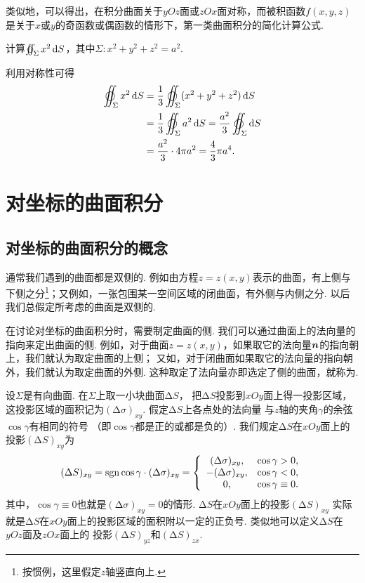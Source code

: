 类似地，可以得出，在积分曲面关于\(yOz\)面或\(zOx\)面对称，而被积函数\(f(x,y,z)\)是关于\(x\)或\(y\)的奇函数或偶函数的情形下，第一类曲面积分的简化计算公式.

\begin{example}
计算\(\varoiint_{\Sigma} x^2 \dd{S}\)，其中\(\Sigma: x^2+y^2+z^2=a^2\).
\begin{solution}
利用对称性可得\begin{align*}
\varoiint_{\Sigma} x^2 \dd{S}
&= \frac{1}{3} \varoiint_{\Sigma} (x^2+y^2+z^2) \dd{S} \\
&= \frac{1}{3} \varoiint_{\Sigma} a^2 \dd{S}
= \frac{a^2}{3} \varoiint_{\Sigma} \dd{S} \\
&= \frac{a^2}{3} \cdot 4\pi a^2
= \frac{4}{3} \pi a^4.
\end{align*}
\end{solution}
\end{example}

\section{对坐标的曲面积分}
\subsection{对坐标的曲面积分的概念}
通常我们遇到的曲面都是双侧的.
例如由方程\(z = z(x,y)\)表示的曲面，有上侧与下侧之分\footnote{按惯例，这里假定\(z\)轴竖直向上.}；又例如，一张包围某一空间区域的闭曲面，有外侧与内侧之分.
以后我们总假定所考虑的曲面是双侧的.

在讨论对坐标的曲面积分时，需要制定曲面的侧.
我们可以通过曲面上的法向量的指向来定出曲面的侧.
例如，对于曲面\(z = z(x,y)\)，如果取它的法向量\(\boldsymbol{n}\)的指向朝上，我们就认为取定曲面的上侧；
又如，对于闭曲面如果取它的法向量的指向朝外，我们就认为取定曲面的外侧.
这种取定了法向量亦即选定了侧的曲面，就称为.

设\(\Sigma\)是有向曲面.
在\(\Sigma\)上取一小块曲面\(\increment S\)，
把\(\increment S\)投影到\(xOy\)面上得一投影区域，
这投影区域的面积记为\((\increment\sigma)_{xy}\).
假定\(\increment S\)上各点处的法向量
与\(z\)轴的夹角\(\gamma\)的余弦\(\cos\gamma\)有相同的符号
（即\(\cos\gamma\)都是正的或都是负的）.
我们规定\(\increment S\)在\(xOy\)面上的投影\((\increment S)_{xy}\)为\[
	(\Delta S)_{xy}
	= \operatorname{sgn}\cos\gamma \cdot (\Delta \sigma)_{xy}
	= \left\{ \begin{array}{cc}
	(\Delta \sigma)_{xy}, & \cos\gamma > 0, \\
	-(\Delta \sigma)_{xy}, & \cos\gamma < 0, \\
	0, & \cos\gamma \equiv 0.
	\end{array} \right.
\]
其中，\(\cos\gamma \equiv 0\)也就是\((\increment \sigma)_{xy} = 0\)的情形.
\(\increment S\)在\(xOy\)面上的投影\((\increment S)_{xy}\)
实际就是\(\increment S\)在\(xOy\)面上的投影区域的面积附以一定的正负号.
类似地可以定义\(\increment S\)在\(yOz\)面及\(zOx\)面上的
投影\((\increment S)_{yz}\)和\((\increment S)_{zx}\).


